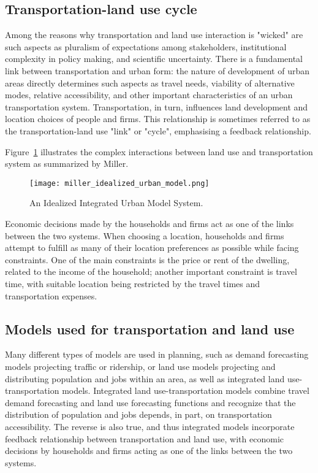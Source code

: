 \subsection{Transportation-land use cycle} \label{subsec:transportation_land_use_cycle}

Among the reasons why transportation and land use interaction is "wicked" are such aspects as pluralism of expectations among stakeholders, institutional complexity in policy making, and scientific uncertainty\cite{Noto2015}.
There is a fundamental link between transportation and urban form: the nature of development of urban areas directly determines such aspects as travel needs, viability of alternative modes, relative accessibility, and other important characteristics of an urban transportation system.
Transportation, in turn, influences land development and location choices of people and firms\cite{Miller1999}.
This relationship is sometimes referred to as the transportation-land use "link" or "cycle", emphasising a feedback relationship\cite{Kelly}.

Figure~\ref{fig:idealized_integrated_urban_model} illustrates the complex interactions between land use and transportation system as summarized by Miller\cite{Miller2018a}.

\begin{figure}[hbt!]
    \centering
    \texttt{[image: miller\_idealized\_urban\_model.png]}
    \caption{An Idealized Integrated Urban Model System\cite{Miller2018a}.}
    \label{fig:idealized_integrated_urban_model}
\end{figure}

Economic decisions made by the households and firms act as one of the links between the two systems.
When choosing a location, households and firms attempt to fulfill as many of their location preferences as possible while facing constraints.
One of the main constraints is the price or rent of the dwelling, related to the income of the household;
another important constraint is travel time, with suitable location being restricted by the travel times and transportation expenses\cite{Moeckel2017}.

\subsection{Models used for transportation and land use} \label{subsec:transportation_land_use_interaction}

Many different types of models are used in planning, such as demand forecasting models projecting traffic or ridership, or land use models projecting and distributing population and jobs within an area, as well as integrated land use-transportation models.
Integrated land use-transportation models combine travel demand forecasting and land use forecasting functions and recognize that the distribution of population and jobs depends, in part, on transportation accessibility.
The reverse is also true, and thus integrated models incorporate feedback relationship between transportation and land use, with economic decisions by households and firms acting as one of the links between the two systems\cite{Miller1999}.

